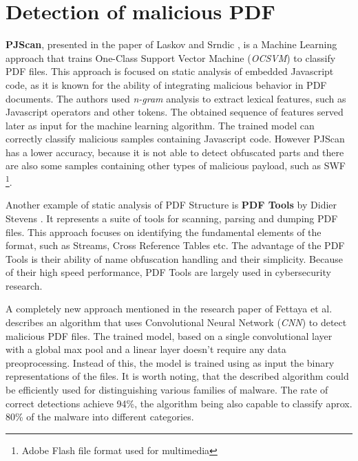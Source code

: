 \section{Detection of malicious PDF}
\label{section:relatedWorkML}
\textbf{PJScan}, presented in the paper of Laskov and Srndic \cite{pjscan}, is a Machine Learning approach that trains One-Class Support Vector Machine (\textit{OCSVM}) to classify PDF files. This approach is focused on static analysis of embedded Javascript code, as it is known for the ability of integrating malicious behavior in PDF documents. The authors used \textit{n-gram} analysis to extract lexical features, such as Javascript operators and other tokens. The obtained sequence of features served later as input for the machine learning algorithm. The trained model can correctly classify malicious samples containing Javascript code. However PJScan has a lower accuracy, because it is not able to detect obfuscated parts and there are also some samples containing other types of malicious payload, such as SWF \footnote{Adobe Flash file format used for multimedia}. \par
Another example of static analysis of PDF Structure is \textbf{PDF Tools} by Didier Stevens \cite{pdftools}. It represents a suite of tools for scanning, parsing and dumping PDF files. This approach focuses on identifying the fundamental elements of the format, such as Streams, Cross Reference Tables etc. The advantage of the PDF Tools is their ability of name obfuscation handling and their simplicity. Because of their high speed performance, PDF Tools are largely used in cybersecurity research. \par
A completely new approach mentioned in the research paper of Fettaya et al. \cite{deepdf} describes an algorithm that uses Convolutional Neural Network (\textit{CNN}) to detect malicious PDF files. The trained model, based on a single convolutional layer with a global max pool and a linear layer doesn't require any data preoprocessing. Instead of this, the model is trained using as input the binary representations of the files. It is worth noting, that the described algorithm could be efficiently used for distinguishing various families of malware. The rate of correct detections achieve 94\%, the algorithm being also capable to classify aprox. 80\% of the malware into different categories.